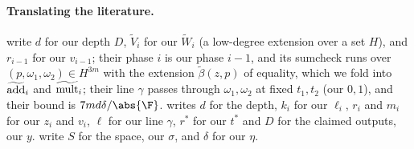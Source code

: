 \begin{refsection}
\paragraph{Translating the literature.} \Textcite{GoldwasserKalaiRothblum2015} write $d$ for our depth $D$, $\tilde V_i$ for our $\tilde W_i$ (a low-degree extension over a set $H$), and $r_{i-1}$ for our $v_{i-1}$; their phase $i$ is our phase $i-1$, and its sumcheck runs over $(p,\omega_1,\omega_2)\in H^{3m}$ with the extension $\tilde\beta(z,p)$ of equality, which we fold into $\widetilde{\mathrm{add}}_i$ and $\widetilde{\mathrm{mult}}_i$; their line $\gamma$ passes through $\omega_1,\omega_2$ at fixed $t_1,t_2$ (our $0,1$), and their bound is $7md\delta/\abs{\F}$. \Textcite{Thaler2022} writes $d$ for the depth, $k_i$ for our $\ell_i$, $r_i$ and $m_i$ for our $z_i$ and $v_i$, $\ell$ for our line $\gamma$, $r^*$ for our $t^*$ and $D$ for the claimed outputs, our $y$. \Textcite{ReingoldRothblumRothblum2021} write $S$ for the space, our $\sigma$, and $\delta$ for our $\eta$.

\printchapterbib
\end{refsection}
